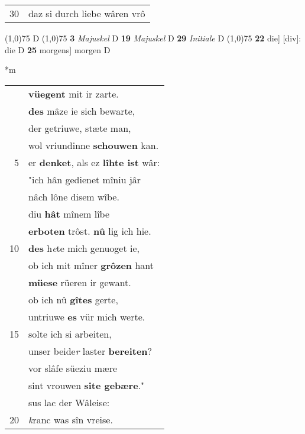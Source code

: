 \documentclass[8pt,a4paper,notitlepage]{article}
\begin{document}
\begin{table}[ht]
\begin{minipage}[t]{0.5\linewidth}
\begin{tabular}{rl}
30 & daz si durch liebe wâren vrô\\ 
\end{tabular}
\scriptsize
\line(1,0){75} \newline
D \newline
\line(1,0){75} \newline
\textbf{3} \textit{Majuskel} D  \textbf{19} \textit{Majuskel} D  \textbf{29} \textit{Initiale} D  \newline
\line(1,0){75} \newline
\textbf{22} die] [div]: die D \textbf{25} morgens] morgen D \newline
\end{minipage}
\hspace{0.5cm}
\begin{minipage}[t]{0.5\linewidth}
\small
\begin{center}*m
\end{center}
\begin{tabular}{rl}
 & \textbf{vüegent} mit ir zarte.\\ 
 & \textbf{des} mâze ie sich bewarte,\\ 
 & der getriuwe, stæte man,\\ 
 & wol vriundinne \textbf{schouwen} kan.\\ 
5 & er \textbf{denket}, als ez \textbf{lîhte ist} wâr:\\ 
 & "ich hân gedienet mîniu jâr\\ 
 & nâch lône disem wîbe.\\ 
 & diu \textbf{hât} mînem lîbe\\ 
 & \textbf{erboten} trôst. \textbf{nû} lig ich hie.\\ 
10 & \textbf{des} h\textit{e}te mich genuoget ie,\\ 
 & ob ich mit mîner \textbf{grôzen} hant\\ 
 & \textbf{müese} rüeren ir gewant.\\ 
 & ob ich nû \textbf{gîtes} gerte,\\ 
 & untriuwe \textbf{es} vür mich werte.\\ 
15 & solte ich si arbeiten,\\ 
 & unser beide\textit{r} laster \textbf{bereiten}?\\ 
 & vor slâfe süeziu mære\\ 
 & sint vrouwen \textbf{site gebære}."\\ 
 & sus lac der Wâleise:\\ 
20 & \textit{k}ranc was sîn vreise.\\ 

\end{tabular}
\end{minipage}
\end{table}
\end{document}
